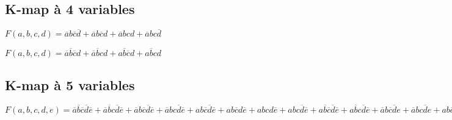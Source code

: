 \documentclass[a4paper,11pt]{article}
\begin{document}
\subsection{K-map à 4 variables}

$F(a,b,c,d)=\overline{a}b\overline{c}\overline{d} +
            \overline{a}b\overline{c}d+
            \overline{a}bcd+
            \overline{a}bc\overline{d}$

$F(a,b,c,d)=\overline{a}\overline{b}\overline{c}d +
            \overline{a}\overline{b}cd +
            a\overline{b}\overline{c}d +
            a\overline{b}cd$


\subsection{K-map à 5 variables}

$F(a,b,c,d,e)=\overline{a}\overline{b}\overline{c}\overline{d}\overline{e} +
              \overline{a}\overline{b}c\overline{d}\overline{e} +
              \overline{a}b\overline{c}\overline{d}\overline{e} +
              \overline{a}bc\overline{d}\overline{e} +
              ab\overline{c}\overline{d}\overline{e} +
              ab\overline{c}d\overline{e} +
              abcd\overline{e} +
              abc\overline{d}\overline{e} +
              a\overline{b}\overline{c}\overline{d}\overline{e} +
              a\overline{b}c\overline{d}\overline{e} +
              \overline{a}b\overline{c}\overline{d}e +
              \overline{a}bc\overline{d}e +
              ab\overline{c}\overline{d}e +
              ab\overline{c}de +
              abcde +
              abc\overline{d}e$
              


\end{document}
